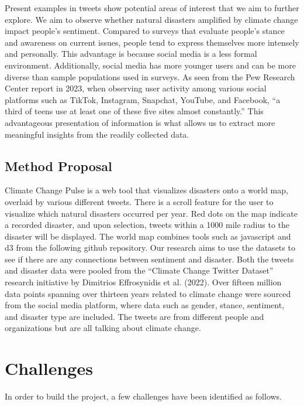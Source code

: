 \documentclass[pdflatex,sn-mathphys-num]{sn-jnl}%
\theoremstyle{thmstyleone}%
\theoremstyle{thmstyletwo}%
\theoremstyle{thmstylethree}%
\begin{document}
Present examples in tweets show potential areas of interest that we aim to further explore. We aim to observe whether natural disasters amplified by climate change impact people's sentiment. Compared to surveys that evaluate people's stance and awareness on current issues, people tend to express themselves more intensely and personally. This advantage is because social media is a less formal environment. Additionally, social media has more younger users and can be more diverse than sample populations used in surveys. As seen from the Pew Research Center report in 2023, when observing user activity among various social platforms such as TikTok, Instagram, Snapchat, YouTube, and Facebook, “a third of teens use at least one of these five sites almost constantly.” This advantageous presentation of information is what allows us to extract more meaningful insights from the readily collected data.

\subsection{Method Proposal}\label{subsec3}

Climate Change Pulse is a web tool that visualizes disasters onto a world map, overlaid by various different tweets. There is a scroll feature for the user to visualize which natural disasters occurred per year. Red dots on the map indicate a recorded disaster, and upon selection, tweets within a 1000 mile radius to the disaster will be displayed. The world map combines tools such as javascript and d3 from the following github repository.
Our research aims to use the datasets to see if there are any connections between sentiment and disaster. Both the tweets and disaster data were pooled from the “Climate Change Twitter Dataset” research initiative by Dimitrios Effrosynidis et al. (2022). Over fifteen million data points spanning over thirteen years related to climate change were sourced from the social media platform, where data such as gender, stance, sentiment, and disaster type are included. The tweets are from different people and organizations but are all talking about climate change. 


\section{Challenges}\label{sec2}
In order to build the project, a few challenges have been identified as follows.
\end{document}
